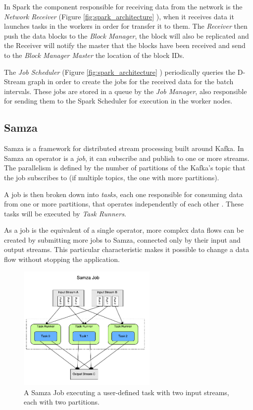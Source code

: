 \documentclass[ppgc,diss,english]{iiufrgs}
\begin{document}
In Spark the component responsible for receiving data from the network is the \emph{Network Receiver} (Figure \ref{fig:spark_architecture} ), when it receives data it launches tasks in the workers in order for transfer it to them. The \emph{Receiver} then push the data blocks to the \emph{Block Manager}, the block will also be replicated and the Receiver will notify the master that the blocks have been received and send to the \emph{Block Manager Master} the location of the block IDs.

The \emph{Job Scheduler} (Figure \ref{fig:spark_architecture} ) periodically queries the D-Stream graph in order to create the jobs for the received data for the batch intervals. These jobs are stored in a queue by the \emph{Job Manager}, also responsible for sending them to the Spark Scheduler for execution in the worker nodes.


\subsection{Samza}

Samza is a framework for distributed stream processing built around Kafka. In Samza an operator is a \emph{job}, it can subscribe and publish to one or more streams. The parallelism is defined by the number of partitions of the Kafka's topic that the job subscribes to (if multiple topics, the one with more partitions). 

A job is then broken down into \emph{tasks}, each one responsible for consuming data from one or more partitions, that operates independently of each other \cite{ramesh2015samza}. These tasks will be executed by \emph{Task Runners}.

As a job is the equivalent of a single operator, more complex data flows can be created by submitting more jobs to Samza, connected only by their input and output streams. This particular characteristic makes it possible to change a data flow without stopping the application.

\begin{figure}[!ht]
	\centering
	\includegraphics[width=0.6\textwidth]{images/samza/job_2.pdf}
	\caption[A Samza Job executing a user-defined task]{A Samza Job executing a user-defined task with two input streams, each with two partitions.}
	\label{fig:samza_job_execution}
\end{figure}
\end{document}
